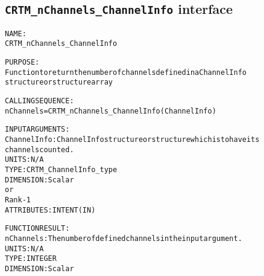 \subsection{\texttt{CRTM\_nChannels\_ChannelInfo} interface}
  \label{sec:CRTM_nChannels_ChannelInfo_interface}
  \begin{alltt}
 
  NAME:
        CRTM_nChannels_ChannelInfo
 
  PURPOSE:
        Function to return the number of channels defined in a ChannelInfo
        structure or structure array
 
  CALLING SEQUENCE:
        nChannels = CRTM_nChannels_ChannelInfo( ChannelInfo )
 
  INPUT ARGUMENTS:
        ChannelInfo: ChannelInfo structure or structure which is to have its
                     channels counted.
                     UNITS:      N/A
                     TYPE:       CRTM_ChannelInfo_type
                     DIMENSION:  Scalar
                                   or
                                 Rank-1
                     ATTRIBUTES: INTENT(IN)
 
  FUNCTION RESULT:
        nChannels:   The number of defined channels in the input argument.
                     UNITS:      N/A
                     TYPE:       INTEGER
                     DIMENSION:  Scalar
 
  \end{alltt}
